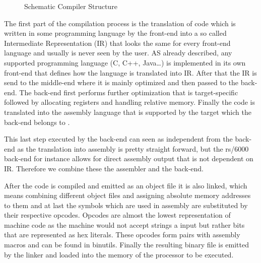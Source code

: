 \begin{figure}
{\begin{minipage}{0.6\textwidth}
\begin{tcolorbox}[beamer,noparskip,breakable,colbacklower=LimeGreen!75!LightGreen,title=linker,remember as=li]
\begin{itemize}
	\end{itemize}
\end{tcolorbox}
\vspace{1cm}
\end{minipage}}
\caption{Schematic Compiler Structure}
\label{fig:comp}
\end{figure}

The first part of the compilation process is the translation of code which is written in some programming language by the front-end into a so called Intermediate Representation (IR) that looks the same for every front-end language and usually is never seen by the user. AS already described, any supported programming language (C, C++, Java…) is implemented in its own front-end that defines how the language is translated into IR. After that the IR is send to the middle-end where it is mainly optimized and then passed to the back-end. The back-end first performs further optimization that is target-specific followed by allocating registers and handling relative memory. Finally the code is translated into the assembly language that is supported by the target which the back-end belongs to \citep{mogensen}.

This last step executed by the back-end can seen as independent from the back-end as the translation into assembly is pretty straight forward, but the rs/6000 back-end for instance allows for direct assembly output that is not dependent on IR. Therefore we combine these the assembler and the back-end.

After the code is compiled and emitted as an object file it is also linked, which means combining different object files and assigning absolute memory addresses to them and at last the symbols which are used in assembly are substituted by their respective opcodes. Opcodes are almost the lowest representation of machine code as the machine would not accept strings a input but rather bits that are represented as hex literals. These opcodes form pairs with assembly macros and can be found in binutils. Finally the resulting binary file is emitted by the linker and loaded into the memory of the processor to be executed.

